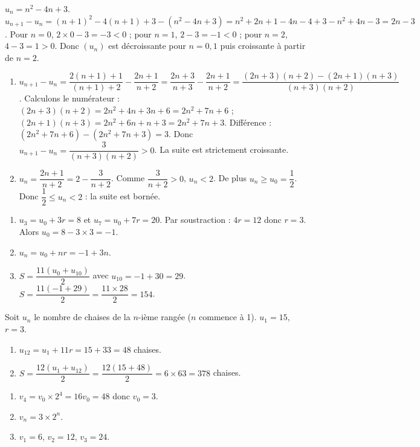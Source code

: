 $u_n = n^2 - 4n + 3$. $u_{n+1} - u_n = (n+1)^2 - 4(n+1) + 3 - (n^2 - 4n + 3) = n^2+2n+1-4n-4+3-n^2+4n-3 = 2n - 3$.
Pour $n=0$, $2\times0-3=-3<0$ ; pour $n=1$, $2-3=-1<0$ ; pour $n=2$, $4-3=1>0$. Donc $(u_n)$ est décroissante pour $n=0,1$ puis croissante à partir de $n=2$.

\begin{enumerate}[label=\alph*)]
\item $u_{n+1} - u_n = \dfrac{2(n+1)+1}{(n+1)+2} - \dfrac{2n+1}{n+2} = \dfrac{2n+3}{n+3} - \dfrac{2n+1}{n+2} = \dfrac{(2n+3)(n+2) - (2n+1)(n+3)}{(n+3)(n+2)}$.
Calculons le numérateur : $(2n+3)(n+2) = 2n^2+4n+3n+6 = 2n^2+7n+6$ ; $(2n+1)(n+3) = 2n^2+6n+n+3 = 2n^2+7n+3$. Différence : $(2n^2+7n+6) - (2n^2+7n+3) = 3$. Donc $u_{n+1} - u_n = \dfrac{3}{(n+3)(n+2)} > 0$. La suite est strictement croissante.
\item $u_n = \dfrac{2n+1}{n+2} = 2 - \dfrac{3}{n+2}$. Comme $\dfrac{3}{n+2} > 0$, $u_n < 2$. De plus $u_n \geq u_0 = \dfrac{1}{2}$. Donc $\dfrac{1}{2} \leq u_n < 2$ : la suite est bornée.
\end{enumerate}

\begin{enumerate}[label=\alph*)]
\item $u_3 = u_0 + 3r = 8$ et $u_7 = u_0 + 7r = 20$. Par soustraction : $4r = 12$ donc $r=3$. Alors $u_0 = 8 - 3\times3 = -1$.
\item $u_n = u_0 + nr = -1 + 3n$.
\item $S = \dfrac{11(u_0 + u_{10})}{2}$ avec $u_{10} = -1 + 30 = 29$. $S = \dfrac{11(-1+29)}{2} = \dfrac{11\times28}{2} = 154$.
\end{enumerate}

Soit $u_n$ le nombre de chaises de la $n$-ième rangée ($n$ commence à 1). $u_1 = 15$, $r=3$.
\begin{enumerate}[label=\alph*)]
\item $u_{12} = u_1 + 11r = 15 + 33 = 48$ chaises.
\item $S = \dfrac{12(u_1 + u_{12})}{2} = \dfrac{12(15+48)}{2} = 6\times63 = 378$ chaises.
\end{enumerate}

\begin{enumerate}[label=\alph*)]
\item $v_4 = v_0 \times 2^4 = 16 v_0 = 48$ donc $v_0 = 3$.
\item $v_n = 3 \times 2^n$.
\item $v_1 = 6$, $v_2 = 12$, $v_3 = 24$.
\end{enumerate}

